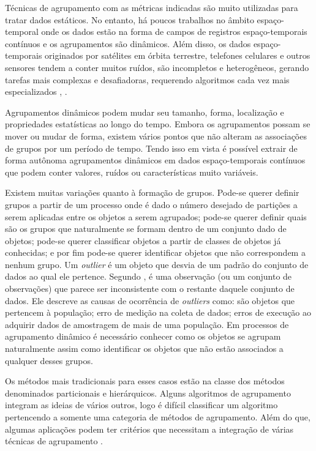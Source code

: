 Técnicas de agrupamento com as métricas indicadas são muito utilizadas para tratar dados estáticos. No entanto, há poucos trabalhos no âmbito espaço-temporal onde os dados estão na forma de campos de registros espaço-temporais contínuos e os agrupamentos são dinâmicos. Além disso, os dados espaço-temporais originados por satélites em órbita terrestre, telefones celulares e outros sensores tendem a conter muitos ruídos, são incompletos e heterogêneos, gerando tarefas mais complexas e desafiadoras, requerendo algoritmos cada vez mais especializados \cite{faghmous2013}, \cite{Mitsa:2010}.


Agrupamentos dinâmicos podem mudar seu tamanho, forma, localização e propriedades estatísticas ao longo do tempo. Embora os agrupamentos possam se mover ou mudar de forma, existem vários pontos que não alteram as associações de grupos por um período de tempo. Tendo isso em vista é possível extrair de forma autônoma agrupamentos dinâmicos em dados espaço-temporais contínuos que podem conter valores, ruídos ou características muito variáveis.

Existem muitas variações quanto à formação de grupos. Pode-se querer definir grupos a partir de um processo onde é dado o número desejado de partições a serem aplicadas entre os objetos a serem agrupados; pode-se querer definir quais são os grupos que naturalmente se formam dentro de um conjunto dado de objetos; pode-se querer classificar objetos a partir de classes de objetos já conhecidas; e por fim pode-se querer identificar objetos que não correspondem a nenhum grupo.
Um \textit{outlier} é um objeto que desvia de um padrão do conjunto de dados ao qual ele pertence. Segundo , é uma observação (ou um conjunto de observações) que parece ser inconsistente com o restante daquele conjunto de dados. Ele descreve as causas de ocorrência de \textit{outliers} como: são objetos que pertencem à população; erro de medição na coleta de dados; erros de execução ao adquirir dados de amostragem de mais de uma população.
Em processos de agrupamento dinâmico é necessário conhecer como os objetos se agrupam naturalmente assim como identificar os objetos que não estão associados a qualquer desses grupos.

Os métodos mais tradicionais para esses casos estão na classe dos métodos denominados particionais e hierárquicos. Alguns algoritmos de agrupamento integram as ideias de vários outros, logo é difícil classificar um algoritmo pertencendo a somente uma categoria de métodos de agrupamento. Além do que, algumas aplicações podem ter critérios que necessitam a integração de várias técnicas de agrupamento \cite{Atluri:2018}.

